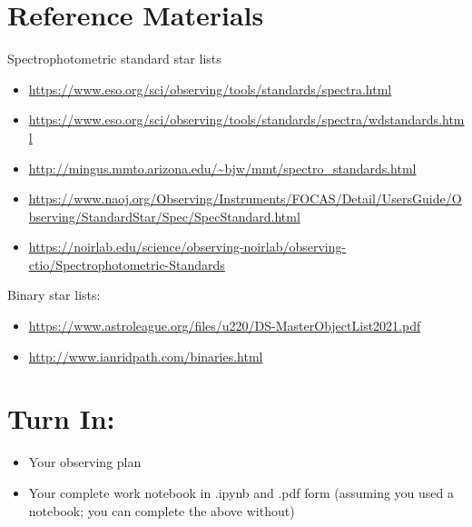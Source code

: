 \documentclass[11pt]{article}
\begin{document}
 

\section{Reference Materials}
Spectrophotometric standard star lists

\begin{itemize}
    \item \url{https://www.eso.org/sci/observing/tools/standards/spectra.html}
    \item \url{https://www.eso.org/sci/observing/tools/standards/spectra/wdstandards.html}
    \item \url{http://mingus.mmto.arizona.edu/~bjw/mmt/spectro_standards.html}
    \item \url{https://www.naoj.org/Observing/Instruments/FOCAS/Detail/UsersGuide/Observing/StandardStar/Spec/SpecStandard.html}
    \item \url{https://noirlab.edu/science/observing-noirlab/observing-ctio/Spectrophotometric-Standards}
\end{itemize}
 

Binary star lists:

\begin{itemize}
    \item \url{https://www.astroleague.org/files/u220/DS-MasterObjectList2021.pdf}
    \item \url{http://www.ianridpath.com/binaries.html}
\end{itemize}

\section{Turn In:}
\begin{itemize}
    \item Your observing plan
    \item Your complete work notebook in .ipynb and .pdf form (assuming you used a notebook; you can complete the above without)
\end{itemize}
\end{document}
